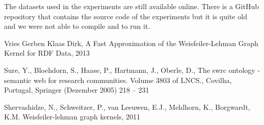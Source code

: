 \documentclass[12pt]{scrartcl}
\begin{document}
The datasets used in the experiments are still available online. There is a GitHub repository that contains the source code of the experiments but it is quite old and we were not able to compile and to run it.


\begin{thebibliography}{9}

    Vries Gerben Klaas Dirk,
    A Fast Approximation of the Weisfeiler-Lehman Graph Kernel for RDF Data,
    2013

    Sure, Y., Bloehdorn, S., Haase, P., Hartmann, J., Oberle, D.,
    The swrc ontology - semantic web for research communities.
    Volume 3803 of LNCS., Covilha,
    Portugal, Springer (Dezember 2005) 218 – 231

    Shervashidze, N., Schweitzer, P., van Leeuwen, E.J., Mehlhorn, K., Borgwardt, K.M.
    Weisfeiler-lehman graph kernels,
    2011

\end{thebibliography}
\end{document}
